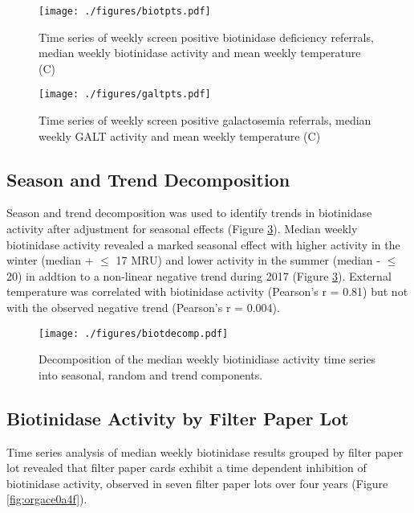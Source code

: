 \documentclass[review]{elsarticle}
\begin{document}
\begin{figure}[htbp]
\centering
\texttt{[image: ./figures/biotpts.pdf]}
\caption{\label{fig:org1950a25}Time series of weekly screen positive biotinidase deficiency referrals, median weekly biotinidase activity and mean weekly temperature (\degree{}C)}
\end{figure}

\begin{figure}[htbp]
\centering
\texttt{[image: ./figures/galtpts.pdf]}
\caption{\label{fig:orgde74bbb}Time series of weekly screen positive galactosemia referrals, median weekly GALT activity and mean weekly temperature (\degree{}C)}
\end{figure}

\clearpage

\subsection*{Season and Trend Decomposition}
\label{sec:org4865da1}
Season and trend decomposition was used to identify trends in
biotinidase activity after adjustment for seasonal effects (Figure
\ref{fig:orgd54bd2e}). Median weekly biotinidase activity revealed a marked
seasonal effect with higher activity in the winter (median + \(\le\) 17
MRU) and lower activity in the summer (median - \(\le\) 20) in addtion to
a non-linear negative trend during 2017 (Figure \ref{fig:orgd54bd2e}). External
temperature was correlated with biotinidase activity (Pearson's r =
0.81) but not with the observed negative trend (Pearson's r = 0.004).

\begin{figure}[htbp]
\centering
\texttt{[image: ./figures/biotdecomp.pdf]}
\caption{\label{fig:orgd54bd2e}Decomposition of the median weekly biotinidiase activity time series into seasonal, random and trend components.}
\end{figure}

\clearpage

\subsection*{Biotinidase Activity by Filter Paper Lot}
\label{sec:orgfe7844f}
Time series analysis of median weekly biotinidase results grouped by
filter paper lot revealed that filter paper cards exhibit a time
dependent inhibition of biotinidase activity, observed in seven filter
paper lots over four years (Figure \ref{fig:orgace0a4f}).
\end{document}

